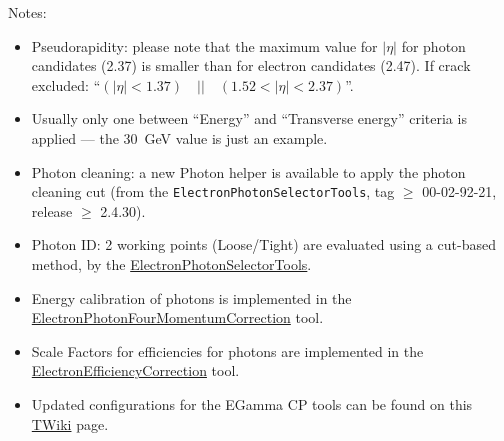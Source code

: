 Notes:
\begin{itemize}
\item Pseudorapidity: please note that the maximum value for \(|\eta|\) for photon candidates (2.37) is smaller than for electron candidates (2.47). 
  If crack excluded: \enquote{\((|\eta| < 1.37) \quad || \quad (1.52 < |\eta| < 2.37)\)}.
\item Usually only one between \enquote{Energy} and \enquote{Transverse energy} criteria is applied --- the \SI{30}{\GeV} value is just an example.
\item Photon cleaning: a new Photon helper is available to apply the photon cleaning cut 
  (from the \texttt{ElectronPhotonSelectorTools}, tag \(\ge\) 00-02-92-21, release \(\ge\) 2.4.30).
\item Photon ID\@: 2 working points (Loose/Tight) are evaluated using a cut-based method, by the
  \href{https://twiki.cern.ch/twiki/bin/view/AtlasProtected/EGammaIdentificationRun2}{ElectronPhotonSelectorTools}.
\item Energy calibration of photons is implemented in the\\
  \href{https://twiki.cern.ch/twiki/bin/view/AtlasProtected/ElectronPhotonFourMomentumCorrection}{ElectronPhotonFourMomentumCorrection} tool.
\item Scale Factors for efficiencies for photons are implemented in the\\
  \href{https://twiki.cern.ch/twiki/bin/view/AtlasProtected/XAODElectronEfficiencyCorrectionTool}{ElectronEfficiencyCorrection} tool.
\item Updated configurations for the EGamma CP tools can be found on this \href{https://twiki.cern.ch/twiki/bin/view/AtlasProtected/EGammaRecommendationsR21}{TWiki} page.
\end{itemize}
